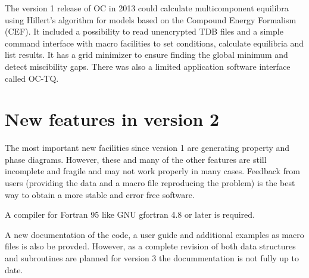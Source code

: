 \documentclass[12pt]{article}
\begin{document}
The version 1 release of OC in 2013 could calculate multicomponent
equilibra using Hillert's algorithm\cite{81Hil} for models based on
the Compound Energy Formalism (CEF)\cite{01Hil,07Luk}. It included a
possibility to read unencrypted TDB files and a simple command
interface with macro facilities to set conditions, calculate
equilibria and list results.  It has a grid minimizer to ensure
finding the global minimum and detect miscibility gaps.  There was
also a limited application software interface called OC-TQ.

\section{New features in version 2}

The most important new facilities since version 1 are generating
property and phase diagrams.  However, these and many of the other
features are still incomplete and fragile and may not work properly in
many cases.  Feedback from users (providing the data and a macro file
reproducing the problem) is the best way to obtain a more stable and
error free software.

A compiler for Fortran 95 like GNU gfortran 4.8 or later is required.

A new documentation of the code, a user guide and additional examples
as macro files is also be provded.  However, as a complete revision of
both data structures and subroutines are planned for version 3 the
docummentation is not fully up to date.
\end{document}
